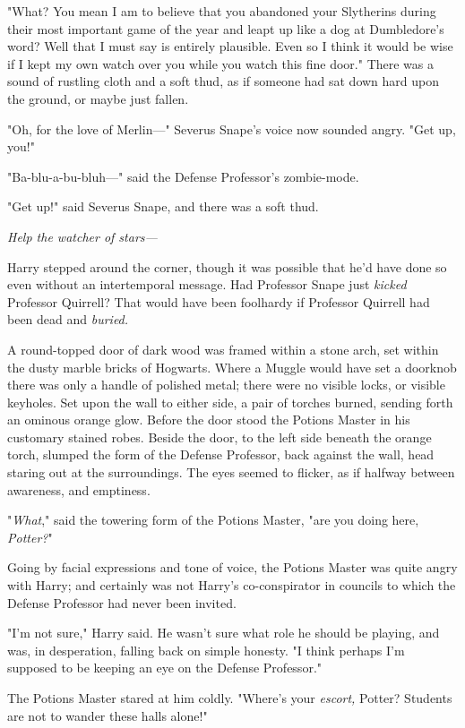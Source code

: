 "What? You mean I am to believe{\el} that you abandoned your
Slytherins{\el} during their most important{\el} game of the year{\el}
and leapt up like a dog{\el} at Dumbledore's word? Well that{\el} I must
say{\el} is entirely plausible. Even so{\el} I think it would be
wise{\el} if I kept my own watch over you{\el} while you watch this fine door."
There was a sound of rustling cloth and a soft thud, as if someone had sat down
hard upon the ground, or maybe just fallen.

"Oh, for the love of Merlin—" Severus Snape's voice now sounded angry. "Get
up, you!"

"Ba-blu-a-bu-bluh—" said the Defense Professor's zombie-mode.

"Get up!" said Severus Snape, and there was a soft thud.

\emph{Help the watcher of stars—}

Harry stepped around the corner, though it was possible that he'd have done so
even without an intertemporal message. Had Professor Snape just \emph{kicked}
Professor Quirrell? That would have been foolhardy if Professor Quirrell had
been dead and \emph{buried.}

A round-topped door of dark wood was framed within a stone arch, set within the
dusty marble bricks of Hogwarts. Where a Muggle would have set a doorknob there
was only a handle of polished metal; there were no visible locks, or visible
keyholes. Set upon the wall to either side, a pair of torches burned, sending
forth an ominous orange glow. Before the door stood the Potions Master in his
customary stained robes. Beside the door, to the left side beneath the orange
torch, slumped the form of the Defense Professor, back against the wall, head
staring out at the surroundings. The eyes seemed to flicker, as if halfway
between awareness, and emptiness.

"\emph{What}," said the towering form of the Potions Master, "are you doing
here, \emph{Potter?}"

Going by facial expressions and tone of voice, the Potions Master was quite
angry with Harry; and certainly was not Harry's co-conspirator in councils to
which the Defense Professor had never been invited.

"I'm not sure," Harry said. He wasn't sure what role he should be playing, and
was, in desperation, falling back on simple honesty. "I think perhaps I'm
supposed to be keeping an eye on the Defense Professor."

The Potions Master stared at him coldly. "Where's your \emph{escort,} Potter?
Students are not to wander these halls alone!"

